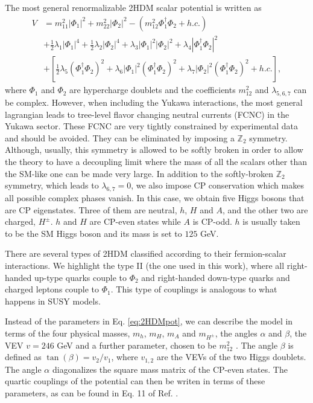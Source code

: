 The most general renormalizable 2HDM scalar potential is written as \cite{2HDMpedro}
\begin{align}
	V&=m_{11}^2 |\Phi_1|^2+m_{22}^2 |\Phi_2|^2-(m_{12}^2 \Phi_1^{\dagger}\Phi_2+h.c.)\nonumber \\
	&+\frac{1}{2}\lambda_1|\Phi_1|^4+\frac{1}{2}\lambda_2|\Phi_2|^4+\lambda_3|\Phi_1|^2|\Phi_2|^2+\lambda_4|\Phi_1^{\dagger}\Phi_2|^2 \nonumber \\
	&+\left[\frac{1}{2}\lambda_5\left(\Phi_1^{\dagger}\Phi_2\right)^2+\lambda_6 |\Phi_1|^2\left(\Phi_1^{\dagger}\Phi_2\right)^2+\lambda_7 |\Phi_2|^2\left(\Phi_1^{\dagger}\Phi_2\right)^2+h.c.\right],	
	\label{eq:2HDMpot}
\end{align}  
where $\Phi_1$ and $\Phi_2$ are hypercharge doublets and the coefficients $m_{12}^2$ and $\lambda_{5,6,7}$ can be complex. However, when including the Yukawa interactions, the most general lagrangian leads to tree-level flavor changing neutral currents (FCNC) in the Yukawa sector. These FCNC are very tightly constrained by experimental data and should be avoided. They can be eliminated by imposing a $\mathbb{Z}_2$ symmetry. Although, usually, this symmetry is allowed to be softly broken in order to allow the theory to have a decoupling limit \cite{2HDMdec} where the mass of all the scalars other than the SM-like one can be made very large. In addition to the softly-broken $\mathbb{Z}_2$ symmetry, which leads to $\lambda_{6,7}=0$, we also impose CP conservation which makes all possible complex phases vanish. In this case, we obtain five Higgs bosons that are CP eigenstates. Three of them are neutral, $h$, $H$ and $A$, and the other two are charged, $H^{\pm}$. $h$ and $H$ are CP-even states while $A$ is CP-odd. $h$ is usually taken to be the SM Higgs boson and its mass is set to $125$ GeV.

There are several types of 2HDM classified according to their fermion-scalar interactions. We highlight the type II (the one used in this work), where all right-handed up-type quarks couple to $\Phi_2$ and right-handed down-type quarks and charged leptons couple to $\Phi_1$. This type of couplings is analogous to what happens in SUSY models. 

Instead of the parameters in Eq. \ref{eq:2HDMpot}, we can describe the model in terms of the four physical masses, $m_h$, $m_H$, $m_A$ and $m_{H^{\pm}}$, the angles $\alpha$ and $\beta$, the VEV $v=246$ GeV and a further parameter, chosen to be $m_{12}^2$ \cite{2HDMpedro}. The angle $\beta$ is defined as $\tan(\beta)=v_2/v_1$, where $v_{1,2}$ are the VEVs of the two Higgs doublets. The angle $\alpha$ diagonalizes the square mass matrix of the CP-even states. The quartic couplings of the potential can then be writen in terms of these parameters, as can be found in Eq. 11 of Ref. \cite{2HDMpedro}.

